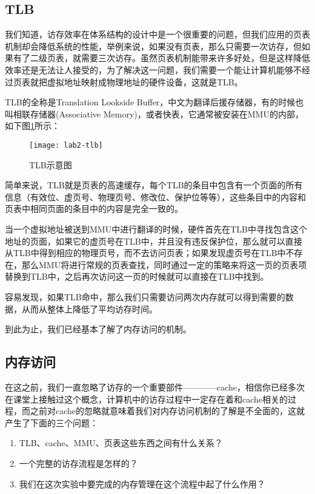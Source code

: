 \subsection{TLB}

我们知道，访存效率在体系结构的设计中是一个很重要的问题，但我们应用的页表机制却会降低系统的性能，举例来说，如果没有页表，那么只需要一次访存，但如果有了二级页表，就需要三次访存。虽然页表机制能带来许多好处，但是这样降低效率还是无法让人接受的，为了解决这一问题，我们需要一个能让计算机能够不经过页表就把虚拟地址映射成物理地址的硬件设备，这就是TLB。

TLB的全称是Translation Lookside Buffer，中文为翻译后援存储器，有的时候也叫相联存储器(Associative Memory)，或者快表，它通常被安装在MMU的内部，如下图\ref{lab2-tlb}所示：

\begin{figure}[htbp]
  \centering
  \texttt{[image: lab2-tlb]}
  \caption{TLB示意图}\label{lab2-tlb}
\end{figure}

简单来说，TLB就是页表的高速缓存，每个TLB的条目中包含有一个页面的所有信息（有效位、虚页号、物理页号、修改位、保护位等等），这些条目中的内容和页表中相同页面的条目中的内容是完全一致的。

当一个虚拟地址被送到MMU中进行翻译的时候，硬件首先在TLB中寻找包含这个地址的页面，如果它的虚页号在TLB中，并且没有违反保护位，那么就可以直接从TLB中得到相应的物理页号，而不去访问页表；如果发现虚页号在TLB中不存在，那么MMU将进行常规的页表查找，同时通过一定的策略来将这一页的页表项替换到TLB中，之后再次访问这一页的时候就可以直接在TLB中找到。

容易发现，如果TLB命中，那么我们只需要访问两次内存就可以得到需要的数据，从而从整体上降低了平均访存时间。

到此为止，我们已经基本了解了内存访问的机制。

\subsection{内存访问}

在这之前，我们一直忽略了访存的一个重要部件————cache，相信你已经多次在课堂上接触过这个概念，计算机中的访存过程中一定存在着和cache相关的过程，而之前对cache的忽略就意味着我们对内存访问机制的了解是不全面的，这就产生了下面的三个问题：

\begin{enumerate}
  \item TLB、cache、MMU、页表这些东西之间有什么关系？
  \item 一个完整的访存流程是怎样的？
  \item 我们在这次实验中要完成的内存管理在这个流程中起了什么作用？
\end{enumerate}

